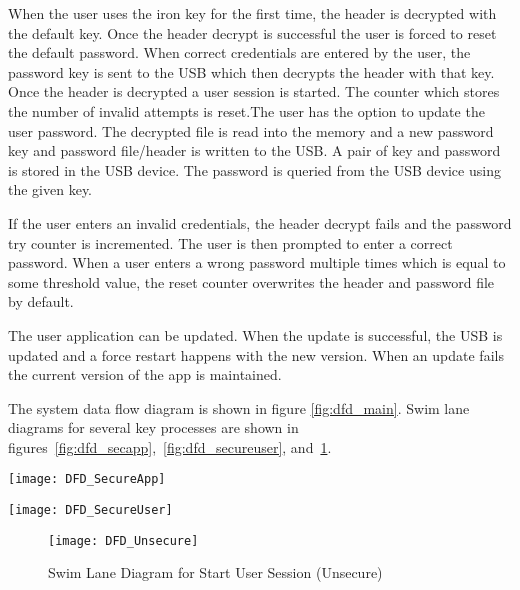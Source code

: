 When the user uses the iron key for the first time, the header is decrypted with
the default key. Once the header decrypt is successful the user is forced to
reset the default password. When correct credentials are entered by the user,
the password key is sent to the USB which then decrypts the header with that
key.  Once the header is decrypted a user session is started. The counter
which stores the number of invalid attempts is reset.The user has the option to
update the user password. The decrypted file is read into the memory and a new
password key and password file/header is written to the USB. A pair of key and
password is stored in the USB device. The password is queried from the USB
device using the given key.

If the user enters an invalid credentials, the header decrypt fails and the
password try counter is incremented. The user is
then prompted to enter a correct password. When a user enters a wrong password
multiple times which is equal to some threshold value, the reset counter
overwrites the header and password file by default.

The user application can be updated. When the update is successful, the USB is
updated and a force restart happens with the new version. When an update fails
the current version of the app is maintained.

The system data flow diagram is shown in figure \ref{fig:dfd_main}. Swim lane diagrams for several key processes are shown in figures~\ref{fig:dfd_secapp},~\ref{fig:dfd_secureuser}, and~\ref{fig:dfd_unsecure}.

\begin{figure*}
    \centering
    \texttt{[image: DFD\_SecureApp]}
    \caption{Swim Lane Diagrams for Device Reset, Start User Session (Secure) and Software Update}
    \label{fig:dfd_secapp}
\end{figure*}

\begin{figure*}
    \centering
    \texttt{[image: DFD\_SecureUser]}
    \caption{Swim Lane Diagrams for Password and File Store Operations}
    \label{fig:dfd_secureuser}
\end{figure*}

\begin{figure}
    \centering
    \texttt{[image: DFD\_Unsecure]}
    \caption{Swim Lane Diagram for Start User Session (Unsecure)}
    \label{fig:dfd_unsecure}
\end{figure}

